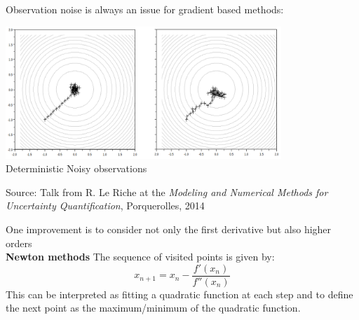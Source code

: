 \documentclass{beamer}
\begin{document}
\begin{frame}{}
Observation noise is always an issue for gradient based methods:\\
\vspace{2mm}
\begin{center}
\includegraphics[height=5cm]{figures/RLRgraddesc}\\
Deterministic \hspace{2.8cm} Noisy observations
\end{center}
\small Source: Talk from R. Le Riche at the \emph{Modeling and Numerical Methods for Uncertainty Quantification}, Porquerolles, 2014
\end{frame}

\begin{frame}{}
One improvement is to consider not only the first derivative but also higher orders\\
\vspace{3mm}
\textbf{Newton methods}
The sequence of visited points is given by:
$$ x_{n+1} = x_n - \frac{f'(x_n)}{f''(x_n)} $$
This can be interpreted as fitting a quadratic function at each step and to define the next point as the maximum/minimum of the quadratic function.
\end{frame}
\end{document}

